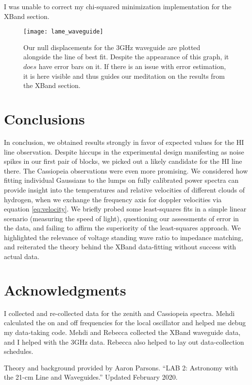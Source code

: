 \documentclass[12pt]{article}
\begin{document}
I was unable to correct my chi-squared minimization implementation for the XBand section.

\begin{figure}
\centering
	\texttt{[image: lame\_waveguide]}
	\caption{Our null displacements for the 3GHz waveguide are plotted alongside the line of best fit. Despite the appearance of this graph, it $does$ have error bars on it. If there is an issue with error estimation, it is here visible and thus guides our meditation on the results from the XBand section.}
	\label{fig:3GHz}
\end{figure}

\section{Conclusions}

\quad \quad In conclusion, we obtained results strongly in favor of expected values for the HI line observation. Despite hiccups in the experimental design manifesting as noise spikes in our first pair of blocks, we picked out a likely candidate for the HI line there. The Cassiopeia observations were even more promising. We considered how fitting individual Gaussians to the lumps on fully calibrated power spectra can provide insight into the temperatures and relative velocities of different clouds of hydrogen, when we exchange the frequency axis for doppler velocities via equation \ref{eq:velocity}. We briefly probed some least-squares fits in a simple linear scenario (measuring the speed of light), questioning our assessments of error in the data, and failing to affirm the superiority of the least-squares approach. We highlighted the relevance of voltage standing wave ratio to impedance matching, and reiterated the theory behind the XBand data-fitting without success with actual data. 

\section{Acknowledgments}

\quad \quad I collected and re-collected data for the zenith and Cassiopeia spectra. Mehdi calculated the on and off frequencies for the local oscillator and helped me debug my data-taking code. Mehdi and Rebecca collected the XBand waveguide data, and I helped with the 3GHz data. Rebecca also helped to lay out data-collection schedules.

Theory and background provided by Aaron Parsons. ``LAB 2: Astronomy with the 21-cm Line and Waveguides.'' Updated February 2020.
\end{document}
